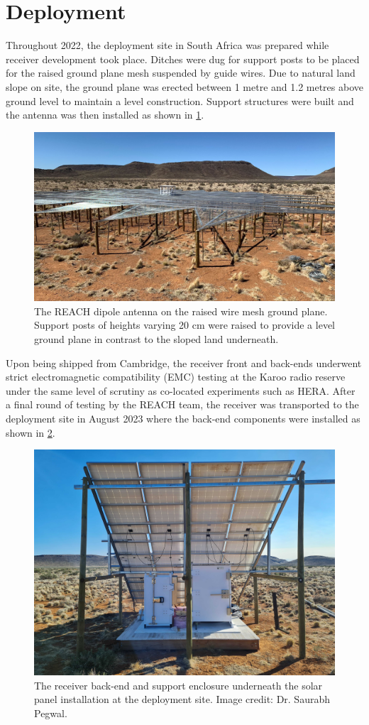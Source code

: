 \section{Deployment}
Throughout 2022, the deployment site in South Africa was prepared while receiver development took place. Ditches were dug for support posts to be placed for the raised ground plane mesh suspended by guide wires. Due to natural land slope on site, the ground plane was erected between 1 metre and 1.2 metres above ground level to maintain a level construction. Support structures were built and the antenna was then installed as shown in \cref{fig:ground_plane}.
\begin{figure}
    \centering
    \includegraphics[width=\textwidth]{ground_plane}
    \caption{The REACH dipole antenna on the raised wire mesh ground plane. Support posts of heights varying 20 cm were raised to provide a level ground plane in contrast to the sloped land underneath.}
    \label{fig:ground_plane}
\end{figure}
Upon being shipped from Cambridge, the receiver front and back-ends underwent strict electromagnetic compatibility (EMC) testing at the Karoo radio reserve under the same level of scrutiny as co-located experiments such as HERA. After a final round of testing by the REACH team, the receiver was transported to the deployment site in August 2023 where the back-end components were installed as shown in \cref{fig:deploy_backend}.
\begin{figure}
    \centering
    \includegraphics[width=.8\textwidth]{deploy_backend.jpg}
    \caption{The receiver back-end and support enclosure underneath the solar panel installation at the deployment site. Image credit: Dr. Saurabh Pegwal.}
    \label{fig:deploy_backend}
\end{figure}

